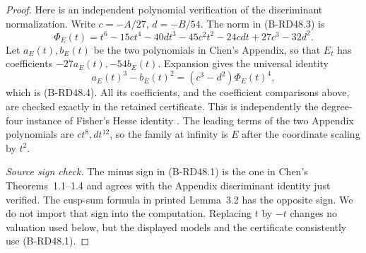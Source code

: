 \begin{proof}
Here is an independent polynomial verification of the
discriminant normalization. Write $c=-A/27$, $d=-B/54$.
The norm in (B-RD48.3) is
\[
 \Phi_E(t)=t^6-15ct^4-40dt^3-45c^2t^2-24cdt+27c^3-32d^2.
                                                               \tag{B-RD48.5}
\]
Let $a_E(t),b_E(t)$ be the two polynomials in Chen's Appendix,
so that $E_t$ has coefficients $-27a_E(t),-54b_E(t)$.
Expansion gives the universal identity
\[
       a_E(t)^3-b_E(t)^2=(c^3-d^2)\Phi_E(t)^4,
\]
which is (B-RD48.4). All its coefficients, and the coefficient
comparisons above, are checked exactly in the retained certificate.
This is independently the degree-four instance of Fisher's
Hesse identity
\cite[Lemma~8.4, equation~(8.1), and Remark~8.6,
preprint pp.19--20]{Fisher2010Hessian}.
The leading terms of the two Appendix polynomials are
$ct^8,dt^{12}$, so the family at infinity is $E$ after the
coordinate scaling by $t^2$.

\emph{Source sign check.} The minus sign in (B-RD48.1) is
the one in Chen's Theorems~1.1--1.4 and agrees with the
Appendix discriminant identity just verified. The cusp-sum
formula in printed Lemma~3.2 has the opposite sign.
We do not import that sign into the computation. Replacing
$t$ by $-t$ changes no valuation used below, but the displayed
models and the certificate consistently use (B-RD48.1).
\end{proof}

